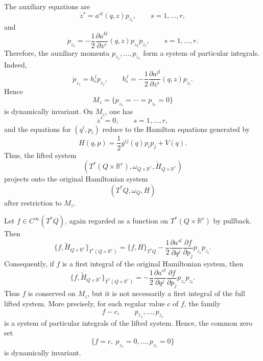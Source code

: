 \documentclass[10pt,a4paper]{article}
\begin{document}
The auxiliary equations are
\begin{equation*}
\dot z^s
=
a^{sl}(q,z)p_{z_l},
\qquad s=1,\ldots,r,
\end{equation*}
and
\begin{equation*}
\dot p_{z_s}
=
-
\frac{1}{2}
\frac{\partial a^{kl}}{\partial z^s}(q,z)
p_{z_k}p_{z_l},
\qquad s=1,\ldots,r.
\end{equation*}
Therefore, the auxiliary momenta \(p_{z_1},\ldots,p_{z_r}\) form a system of particular integrals. Indeed,
\begin{equation*}
\dot p_{z_s}
=
b_s^{\,j}p_{z_j},
\qquad
b_s^{\,j}
=
-
\frac{1}{2}
\frac{\partial a^{jl}}{\partial z^s}(q,z)p_{z_l}.
\end{equation*}
Hence
\[
M_z=\{p_{z_1}=\cdots=p_{z_r}=0\}
\]
is dynamically invariant. On \(M_z\), one has
\[
\dot z^s=0,\qquad s=1,\ldots,r,
\]
and the equations for \((q^i,p_i)\) reduce to the Hamilton equations generated by
\[
H(q,p)=\frac{1}{2}g^{ij}(q)p_ip_j+V(q).
\]
Thus, the lifted system
\[
\left(T^*(Q\times\mathbb R^r),\omega_{Q\times\mathbb R^r},
\widetilde H_{Q\times\mathbb R^r}\right)
\]
projects onto the original Hamiltonian system
\[
(T^*Q,\omega_Q,H)
\]
after restriction to \(M_z\).

Let \(f\in C^\infty(T^*Q)\), again regarded as a function on \(T^*(Q\times\mathbb R^r)\) by pullback. Then
\begin{equation*}
\{f,\widetilde H_{Q\times\mathbb R^r}\}_{T^*(Q\times\mathbb R^r)}
=
\{f,H\}_{T^*Q}
-
\frac{1}{2}
\frac{\partial a^{sl}}{\partial q^j}
\frac{\partial f}{\partial p_j}
p_{z_s}p_{z_l}.
\end{equation*}
Consequently, if \(f\) is a first integral of the original Hamiltonian system, then
\begin{equation*}
\{f,\widetilde H_{Q\times\mathbb R^r}\}_{T^*(Q\times\mathbb R^r)}
=
-
\frac{1}{2}
\frac{\partial a^{sl}}{\partial q^j}
\frac{\partial f}{\partial p_j}
p_{z_s}p_{z_l}.
\end{equation*}
Thus \(f\) is conserved on \(M_z\), but it is not necessarily a first integral of the full lifted system. More precisely, for each regular value \(c\) of \(f\), the family
\[
f-c,\qquad p_{z_1},\ldots,p_{z_r}
\]
is a system of particular integrals of the lifted system. Hence, the common zero set
\[
\{f=c,\ p_{z_1}=0,\ldots,p_{z_r}=0\}
\]
is dynamically invariant.
\end{document}
